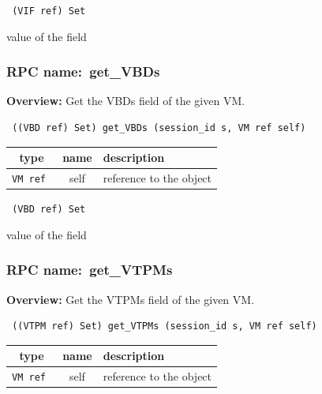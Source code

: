 \vspace{0.3cm}

{\tt 
(VIF ref) Set
}


value of the field
\vspace{0.3cm}
\vspace{0.3cm}
\vspace{0.3cm}
\subsubsection{RPC name:~get\_VBDs}

{\bf Overview:} 
Get the VBDs field of the given VM.

\begin{verbatim} ((VBD ref) Set) get_VBDs (session_id s, VM ref self)\end{verbatim}



 
\vspace{0.3cm}
\begin{tabular}{|c|c|p{7cm}|}
 \hline
{\bf type} & {\bf name} & {\bf description} \\ \hline
{\tt VM ref } & self & reference to the object \\ \hline 

\end{tabular}

\vspace{0.3cm}

{\tt 
(VBD ref) Set
}


value of the field
\vspace{0.3cm}
\vspace{0.3cm}
\vspace{0.3cm}
\subsubsection{RPC name:~get\_VTPMs}

{\bf Overview:} 
Get the VTPMs field of the given VM.

\begin{verbatim} ((VTPM ref) Set) get_VTPMs (session_id s, VM ref self)\end{verbatim}



 
\vspace{0.3cm}
\begin{tabular}{|c|c|p{7cm}|}
 \hline
{\bf type} & {\bf name} & {\bf description} \\ \hline
{\tt VM ref } & self & reference to the object \\ \hline 

\end{tabular}


